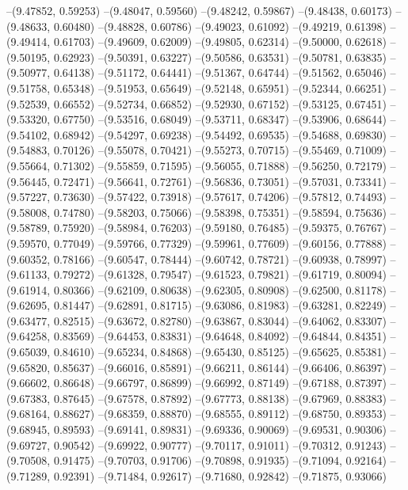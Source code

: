 --(9.47852, 0.59253)
--(9.48047, 0.59560)
--(9.48242, 0.59867)
--(9.48438, 0.60173)
--(9.48633, 0.60480)
--(9.48828, 0.60786)
--(9.49023, 0.61092)
--(9.49219, 0.61398)
--(9.49414, 0.61703)
--(9.49609, 0.62009)
--(9.49805, 0.62314)
--(9.50000, 0.62618)
--(9.50195, 0.62923)
--(9.50391, 0.63227)
--(9.50586, 0.63531)
--(9.50781, 0.63835)
--(9.50977, 0.64138)
--(9.51172, 0.64441)
--(9.51367, 0.64744)
--(9.51562, 0.65046)
--(9.51758, 0.65348)
--(9.51953, 0.65649)
--(9.52148, 0.65951)
--(9.52344, 0.66251)
--(9.52539, 0.66552)
--(9.52734, 0.66852)
--(9.52930, 0.67152)
--(9.53125, 0.67451)
--(9.53320, 0.67750)
--(9.53516, 0.68049)
--(9.53711, 0.68347)
--(9.53906, 0.68644)
--(9.54102, 0.68942)
--(9.54297, 0.69238)
--(9.54492, 0.69535)
--(9.54688, 0.69830)
--(9.54883, 0.70126)
--(9.55078, 0.70421)
--(9.55273, 0.70715)
--(9.55469, 0.71009)
--(9.55664, 0.71302)
--(9.55859, 0.71595)
--(9.56055, 0.71888)
--(9.56250, 0.72179)
--(9.56445, 0.72471)
--(9.56641, 0.72761)
--(9.56836, 0.73051)
--(9.57031, 0.73341)
--(9.57227, 0.73630)
--(9.57422, 0.73918)
--(9.57617, 0.74206)
--(9.57812, 0.74493)
--(9.58008, 0.74780)
--(9.58203, 0.75066)
--(9.58398, 0.75351)
--(9.58594, 0.75636)
--(9.58789, 0.75920)
--(9.58984, 0.76203)
--(9.59180, 0.76485)
--(9.59375, 0.76767)
--(9.59570, 0.77049)
--(9.59766, 0.77329)
--(9.59961, 0.77609)
--(9.60156, 0.77888)
--(9.60352, 0.78166)
--(9.60547, 0.78444)
--(9.60742, 0.78721)
--(9.60938, 0.78997)
--(9.61133, 0.79272)
--(9.61328, 0.79547)
--(9.61523, 0.79821)
--(9.61719, 0.80094)
--(9.61914, 0.80366)
--(9.62109, 0.80638)
--(9.62305, 0.80908)
--(9.62500, 0.81178)
--(9.62695, 0.81447)
--(9.62891, 0.81715)
--(9.63086, 0.81983)
--(9.63281, 0.82249)
--(9.63477, 0.82515)
--(9.63672, 0.82780)
--(9.63867, 0.83044)
--(9.64062, 0.83307)
--(9.64258, 0.83569)
--(9.64453, 0.83831)
--(9.64648, 0.84092)
--(9.64844, 0.84351)
--(9.65039, 0.84610)
--(9.65234, 0.84868)
--(9.65430, 0.85125)
--(9.65625, 0.85381)
--(9.65820, 0.85637)
--(9.66016, 0.85891)
--(9.66211, 0.86144)
--(9.66406, 0.86397)
--(9.66602, 0.86648)
--(9.66797, 0.86899)
--(9.66992, 0.87149)
--(9.67188, 0.87397)
--(9.67383, 0.87645)
--(9.67578, 0.87892)
--(9.67773, 0.88138)
--(9.67969, 0.88383)
--(9.68164, 0.88627)
--(9.68359, 0.88870)
--(9.68555, 0.89112)
--(9.68750, 0.89353)
--(9.68945, 0.89593)
--(9.69141, 0.89831)
--(9.69336, 0.90069)
--(9.69531, 0.90306)
--(9.69727, 0.90542)
--(9.69922, 0.90777)
--(9.70117, 0.91011)
--(9.70312, 0.91243)
--(9.70508, 0.91475)
--(9.70703, 0.91706)
--(9.70898, 0.91935)
--(9.71094, 0.92164)
--(9.71289, 0.92391)
--(9.71484, 0.92617)
--(9.71680, 0.92842)
--(9.71875, 0.93066)
